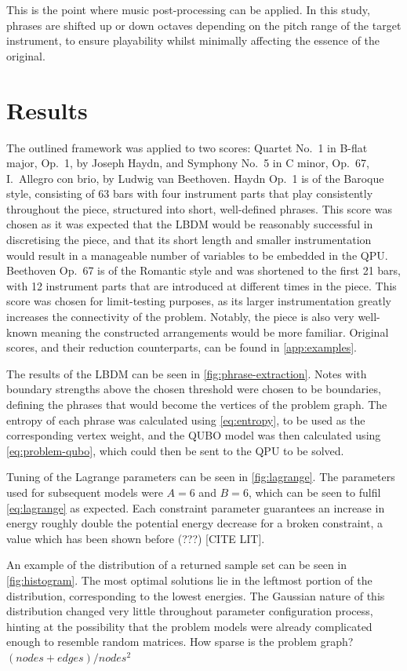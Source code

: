 \documentclass[12pt]{article}
\theoremstyle{definition}
\begin{document}
This is the point where music post-processing can be applied. In this study, phrases are shifted up or down octaves depending on the pitch range of the target instrument, to ensure playability whilst minimally affecting the essence of the original.

\section{Results}

The outlined framework was applied to two scores: Quartet No.\ 1 in B-flat major, Op.\ 1, by Joseph Haydn, and Symphony No.\ 5 in C minor, Op.\ 67, I.\ Allegro con brio, by Ludwig van Beethoven. Haydn Op.\ 1 is of the Baroque style, consisting of 63 bars with four instrument parts that play consistently throughout the piece, structured into short, well-defined phrases. This score was chosen as it was expected that the LBDM would be reasonably successful in discretising the piece, and that its short length and smaller instrumentation would result in a manageable number of variables to be embedded in the QPU. Beethoven Op.\ 67 is of the Romantic style and was shortened to the first 21 bars, with 12 instrument parts that are introduced at different times in the piece. This score was chosen for limit-testing purposes, as its larger instrumentation greatly increases the connectivity of the problem. Notably, the piece is also very well-known meaning the constructed arrangements would be more familiar.
Original scores, and their reduction counterparts, can be found in \cref{app:examples}.

The results of the LBDM can be seen in \cref{fig:phrase-extraction}. Notes with boundary strengths above the chosen threshold were chosen to be boundaries, defining the phrases that would become the vertices of the problem graph. The entropy of each phrase was calculated using \cref{eq:entropy}, to be used as the corresponding vertex weight, and the QUBO model was then calculated using \cref{eq:problem-qubo}, which could then be sent to the QPU to be solved.

Tuning of the Lagrange parameters can be seen in \cref{fig:lagrange}. The parameters used for subsequent models were $A=6$ and $B=6$, which can be seen to fulfil \cref{eq:lagrange} as expected. Each constraint parameter guarantees an increase in energy roughly double the potential energy decrease for a broken constraint, a value which has been shown before (???) [CITE LIT].

An example of the distribution of a returned sample set can be seen in \cref{fig:histogram}. The most optimal solutions lie in the leftmost portion of the distribution, corresponding to the lowest energies. The Gaussian nature of this distribution changed very little throughout parameter configuration process, hinting at the possibility that the problem models were already complicated enough to resemble random matrices. How sparse is the problem graph? $(nodes + edges)/nodes^2$
\end{document}
